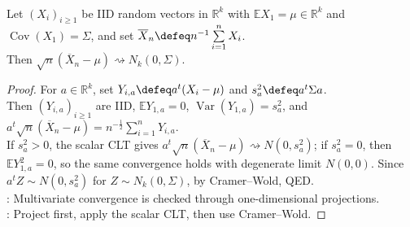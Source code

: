 \begin{theorem} \label{thm:multivariate-central-limit-theorem} \\
Let $(X_i)_{i\geq1}$ be IID random vectors in $\mathbb{R}^k$ with $\mathbb{E}X_1=\mu\in\mathbb{R}^k$ and $\operatorname{Cov}(X_1)=\Sigma$, and set $\overline{X}_n\defeq n^{-1}\sum\limits_{i=1}^{n}X_i$.\\
Then $\sqrt{n}(\overline{X}_n-\mu)\rightsquigarrow N_k(0,\Sigma)$.
\begin{proof} For $a\in\mathbb{R}^k$, set $Y_{i,a}\defeq a^t(X_i-\mu)$ and $s_a^2\defeq a^t\Sigma a$.\\
Then $(Y_{i,a})_{i\geq1}$ are IID, $\mathbb{E}Y_{1,a}=0$, $\operatorname{Var}(Y_{1,a})=s_a^2$, and $a^t\sqrt{n}(\overline{X}_n-\mu)=n^{-\frac{1}{2}}\sum\limits_{i=1}^{n}Y_{i,a}$.\\
If $s_a^2>0$, the scalar CLT gives $a^t\sqrt{n}(\overline{X}_n-\mu)\rightsquigarrow N(0,s_a^2)$; if $s_a^2=0$, then $\mathbb{E}Y_{1,a}^2=0$, so the same convergence holds with degenerate limit $N(0,0)$. Since $a^tZ\sim N(0,s_a^2)$ for $Z\sim N_k(0,\Sigma)$, by Cramer--Wold, QED.\\
: Multivariate convergence is checked through one-dimensional projections.\\
: Project first, apply the scalar CLT, then use Cramer--Wold.
\end{proof}
\end{theorem}

